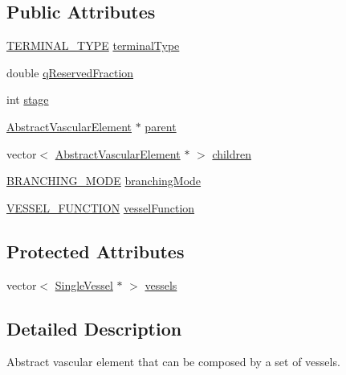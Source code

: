 \subsection*{Public Attributes}
\begin{DoxyCompactItemize}
\item 
\hyperlink{class_abstract_vascular_element_a9c7d6ae9fe8c220ddad143208b0a5a11}{T\+E\+R\+M\+I\+N\+A\+L\+\_\+\+T\+Y\+PE} \hyperlink{class_abstract_vascular_element_a334fcc3576ed763aee815e8930251b94}{terminal\+Type}
\item 
double \hyperlink{class_abstract_vascular_element_a6137eb31a060a8806a44204b421d074f}{q\+Reserved\+Fraction}
\item 
int \hyperlink{class_abstract_vascular_element_a8a9351cffd2ca12dd531ab10fcd01b81}{stage}
\item 
\hyperlink{class_abstract_vascular_element}{Abstract\+Vascular\+Element} $\ast$ \hyperlink{class_abstract_vascular_element_aa43cbab70a108afebfdacd3e8a181b38}{parent}
\item 
vector$<$ \hyperlink{class_abstract_vascular_element}{Abstract\+Vascular\+Element} $\ast$ $>$ \hyperlink{class_abstract_vascular_element_a4f960c758678631f7a046b7becfe021b}{children}
\item 
\hyperlink{class_abstract_vascular_element_a2f7b3a097b944cd0b056fee00b93c860}{B\+R\+A\+N\+C\+H\+I\+N\+G\+\_\+\+M\+O\+DE} \hyperlink{class_abstract_vascular_element_a3bd09108bf46c95f5cf790e910744cd1}{branching\+Mode}
\item 
\hyperlink{class_abstract_vascular_element_a7d7b7863aae4952ba79a590ee65702ec}{V\+E\+S\+S\+E\+L\+\_\+\+F\+U\+N\+C\+T\+I\+ON} \hyperlink{class_abstract_vascular_element_a4d207777a63223377e3a8b69c50c2a08}{vessel\+Function}
\end{DoxyCompactItemize}
\subsection*{Protected Attributes}
\begin{DoxyCompactItemize}
\item 
vector$<$ \hyperlink{class_single_vessel}{Single\+Vessel} $\ast$ $>$ \hyperlink{class_abstract_vascular_element_ace778eb36210480ccfbaadfcd8c4802b}{vessels}
\end{DoxyCompactItemize}


\subsection{Detailed Description}
Abstract vascular element that can be composed by a set of vessels. 

